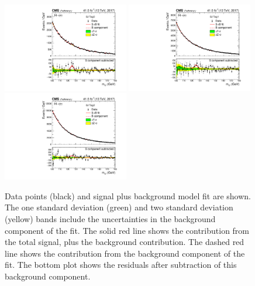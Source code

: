 \begin{figure}[hptb]
  \centering
  \includegraphics[width=0.49\textwidth]{Figures/Appendices/_forAppendix2017ch2_RECO_0J_Tag0_13TeV.pdf}
  \includegraphics[width=0.49\textwidth]{Figures/Appendices/_forAppendix2017ch2_RECO_0J_Tag1_13TeV.pdf}
  \includegraphics[width=0.49\textwidth]{Figures/Appendices/_forAppendix2017ch2_RECO_0J_Tag2_13TeV.pdf}
  \caption[Signal plus background fits to data.]
  {
    Data points (black) and signal plus background model fit are shown. 
    The one standard deviation (green) and two standard deviation (yellow) bands 
    include the uncertainties in the background component of the fit. 
    The solid red line shows the contribution from the total signal, plus the background contribution. 
    The dashed red line shows the contribution from the background component of the fit. 
    The bottom plot shows the residuals after subtraction of this background component.
  }
\end{figure}

